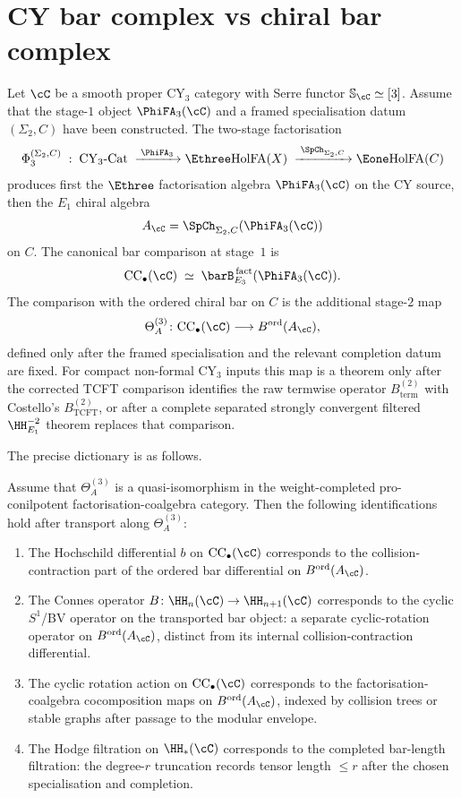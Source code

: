 \section{CY bar complex vs chiral bar complex}
\label{sec:cy-bar-vs-chiral-bar}

Let $\cC$ be a smooth proper CY$_3$ category with Serre functor
$\mathbb{S}_\cC \simeq [3]$. Assume that the stage-$1$ object
$\PhiFA_3(\cC)$ and a framed specialisation datum $(\Sigma_2,C)$ have
been constructed. The two-stage factorisation
\[
 \Phi_3^{(\Sigma_2,C)} \;:\; \mathrm{CY}_3\text{-}\mathrm{Cat}
 \;\xrightarrow{\;\PhiFA_3\;}
 \Ethree\mathrm{HolFA}(X)
 \;\xrightarrow{\;\SpCh_{\Sigma_2,C}\;}
 \Eone\mathrm{HolFA}(C)
\]
produces first the $\Ethree$ factorisation algebra $\PhiFA_3(\cC)$ on
the CY source, then the $E_1$ chiral algebra
\[
 A_\cC=\SpCh_{\Sigma_2,C}(\PhiFA_3(\cC))
\]
on $C$. The canonical bar comparison at stage~$1$ is
\[
 \mathrm{CC}_\bullet(\cC)
 \;\simeq\;
 \barB^{\,\mathrm{fact}}_{E_3}(\PhiFA_3(\cC)).
\]
The comparison with the ordered chiral bar on $C$ is the additional
stage-$2$ map
\[
 \Theta_A^{(3)}\colon
 \mathrm{CC}_\bullet(\cC)\longrightarrow B^{\mathrm{ord}}(A_\cC),
\]
defined only after the framed specialisation and the relevant completion
datum are fixed. For compact non-formal CY$_3$ inputs this map is a
theorem only after the corrected TCFT comparison identifies the raw
termwise operator $B^{(2)}_{\mathrm{term}}$ with Costello's
$B^{(2)}_{\mathrm{TCFT}}$, or after a complete separated strongly
convergent filtered $\HH^{-2}_{E_1}$ theorem replaces that comparison.

The precise dictionary is as follows.

\begin{proposition}
\label{prop:bar-dictionary}
Assume that $\Theta_A^{(3)}$ is a quasi-isomorphism in the
weight-completed pro-conilpotent factorisation-coalgebra category. Then
the following identifications hold after transport along
$\Theta_A^{(3)}$:
\begin{enumerate}[label=(\roman*)]
 \item The Hochschild differential $b$ on $\mathrm{CC}_\bullet(\cC)$
 corresponds to the collision-contraction part of the ordered bar
 differential on $B^{\mathrm{ord}}(A_\cC)$.
 \item The Connes operator
 $B \colon \HH_n(\cC) \to \HH_{n+1}(\cC)$ corresponds to the cyclic
 $S^1$/BV operator on the transported bar object: a separate
 cyclic-rotation operator on $B^{\mathrm{ord}}(A_\cC)$, distinct
 from its internal collision-contraction differential.
 \item The cyclic rotation action on $\mathrm{CC}_\bullet(\cC)$
 corresponds to the factorisation-coalgebra cocomposition maps on
 $B^{\mathrm{ord}}(A_\cC)$, indexed by collision trees or stable graphs
 after passage to the modular envelope.
 \item The Hodge filtration on $\HH_*(\cC)$ corresponds to the completed
 bar-length filtration: the degree-$r$ truncation records tensor length
 $\leq r$ after the chosen specialisation and completion.
\end{enumerate}
\end{proposition}

